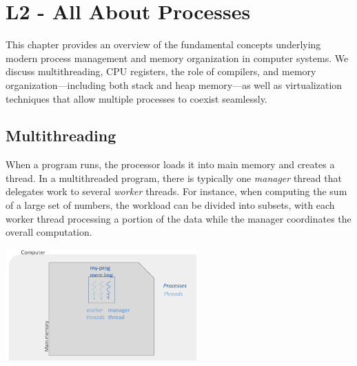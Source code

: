 
\chapter{L2 - All About Processes}
This chapter provides an overview of the fundamental concepts underlying modern process management and memory organization in computer systems. We discuss multithreading, CPU registers, the role of compilers, and memory organization—including both stack and heap memory—as well as virtualization techniques that allow multiple processes to coexist seamlessly.
\small
\section{Multithreading}
When a program runs, the processor loads it into main memory and creates a thread. In a multithreaded program, there is typically one \emph{manager} thread that delegates work to several \emph{worker} threads. For instance, when computing the sum of a large set of numbers, the workload can be divided into subsets, with each worker thread processing a portion of the data while the manager coordinates the overall computation.

\begin{center}
    \includegraphics[width=0.55\textwidth]{chapters/L2/images/multi_threads.png}
\end{center}

